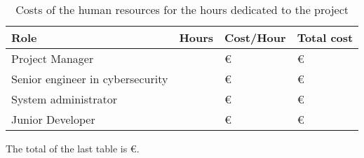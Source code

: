 \begin{table}[H]
	\begin{tabularx}{\textwidth}{|X|l|l|l|}
		\hline
		\rowcolor{gray!30}
		Role                             & Hours                  & Cost/Hour                  & Total cost\\ \hline
		Project Manager                  & \fpeval{\TutorHours*2} & \ProjectManagerHour\euro{} & \ProjectManagerHourTotal\euro{}\\ \hline
		Senior engineer in cybersecurity & \TutorHours            & \SeniorEngineerHour\euro{} & \SeniorEngineerHourTotal\euro{}\\ \hline
		System administrator             & \TutorHours            & \SysAdminHour\euro{}       & \SysAdminHourTotal\euro{}\\ \hline
		Junior Developer                 & \projecthours          & \JuniorDeveloperHour\euro{}& \JuniorDeveloperHourTotal\euro{}\\ \hline
	\end{tabularx}
	\caption{Costs of the human resources for the hours dedicated to the project}
\end{table}
\linej
The total of the last table is \HRTotal\euro{}.

